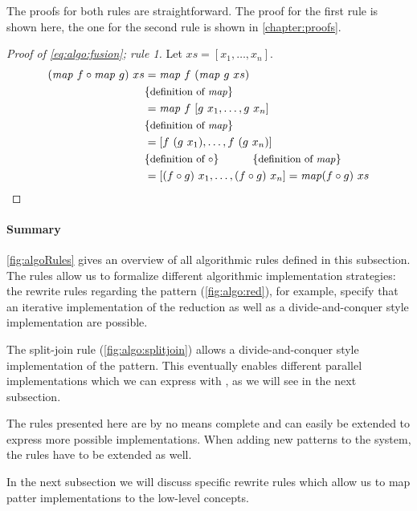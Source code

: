 The proofs for both rules are straightforward.
The proof for the first rule is shown here, the one for the second rule is shown in \autoref{chapter:proofs}.

\begin{proof}[Proof of \autoref{eq:algo:fusion}; rule 1]
  Let $xs = [x_1, \ldots, x_n]$.
  \begin{align*}
    (\text{\textit{map}}\ f\circ \text{\textit{map}}\ g)\ xs
      &= \text{\textit{map}}\ f\ (\text{\textit{map}}\ g\ xs)\\
      &\{\text{\small definition of \text{\textit{map}}}\}\\
      &= \text{\textit{map}}\ f\ [g\ x_1, \ldots, g\ x_n]\\
      &\{\text{\small definition of \text{\textit{map}}}\}\\
      &= [f\ (g\ x_1), \ldots, f\ (g\ x_n)]\\
      &\{\text{\small definition of $\circ$}\}\qquad\quad \{\text{\small definition of \text{\textit{map}}}\}\\
      &= [(f\circ g)\ x_1, \ldots, (f\circ g)\ x_n] = \text{\textit{map}} (f\circ g)\ xs
  \end{align*}
\end{proof}

\paragraph{Summary}
\autoref{fig:algoRules} gives an overview of all algorithmic rules defined in this subsection.
The rules allow us to formalize different algorithmic implementation strategies:
the rewrite rules regarding the \reduce pattern (\autoref{fig:algo:red}), for example, specify that an iterative implementation of the reduction as well as a divide-and-conquer style implementation are possible.

The split-join rule (\autoref{fig:algo:splitjoin}) allows a divide-and-conquer style implementation of the \map pattern.
This eventually enables different parallel implementations which we can express with \OpenCL, as we will see in the next subsection.

The rules presented here are by no means complete and can easily be extended to express more possible implementations.
When adding new patterns to the system, the rules have to be extended as well.

In the next subsection we will discuss \OpenCL specific rewrite rules which allow us to map patter implementations to the low-level \OpenCL concepts.

